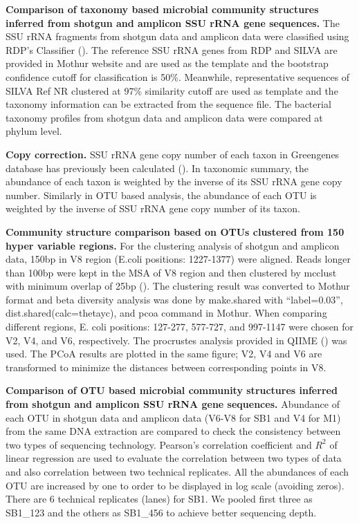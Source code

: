 \documentclass[12pt]{article}
\begin{document}
{\bf Comparison of taxonomy based microbial community structures
inferred from shotgun and amplicon SSU rRNA gene sequences. } The SSU
rRNA fragments from shotgun data and amplicon data were classified
using RDP’s Classifier (\cite{rdpclassifier}). The reference SSU rRNA
genes from RDP and SILVA are provided in Mothur website and are used
as the template and the bootstrap confidence cutoff for classification
is 50\%. Meanwhile, representative sequences of SILVA Ref NR clustered
at 97\% similarity cutoff are used as template and the taxonomy
information can be extracted from the sequence file. The bacterial
taxonomy profiles from shotgun data and amplicon data were compared at
phylum level.

{\bf Copy correction. } SSU rRNA gene copy number of each taxon in
Greengenes database has previously been calculated
(\cite{copyrighter}). In taxonomic summary, the abundance of each
taxon is weighted by the inverse of its SSU rRNA gene copy
number. Similarly in OTU based analysis, the abundance of each OTU is
weighted by the inverse of SSU rRNA gene copy number of its taxon.

{\bf Community structure comparison based on OTUs clustered from 150
hyper variable regions. } For the clustering analysis of shotgun and
amplicon data, 150bp in V8 region (E.coli positions: 1227-1377) were
aligned. Reads longer than 100bp were kept in the MSA of V8 region and
then clustered by mcclust with minimum overlap of 25bp
(\cite{rdp2009}). The clustering result was converted to Mothur format
and beta diversity analysis was done by make.shared with
``label=0.03'', dist.shared(calc=thetayc), and pcoa command in
Mothur. When comparing different regions, E. coli positions: 127-277,
577-727, and 997-1147 were chosen for V2, V4, and V6,
respectively. The procrustes analysis provided in QIIME (\cite{qiime})
was used. The PCoA results are plotted in the same figure; V2, V4 and
V6 are transformed to minimize the distances between corresponding
points in V8.

{\bf Comparison of OTU based microbial community structures inferred
from shotgun and amplicon SSU rRNA gene sequences. } Abundance of each
OTU in shotgun data and amplicon data (V6-V8 for SB1 and V4 for M1)
from the same DNA extraction are compared to check the consistency
between two types of sequencing technology. Pearson’s correlation
coefficient and $R^2$ of linear regression are used to evaluate the
correlation between two types of data and also correlation between two
technical replicates. All the abundances of each OTU are increased by
one to order to be displayed in log scale (avoiding zeros). There are
6 technical replicates (lanes) for SB1. We pooled first three as
SB1\_123 and the others as SB1\_456 to achieve better sequencing
depth.
\end{document}
